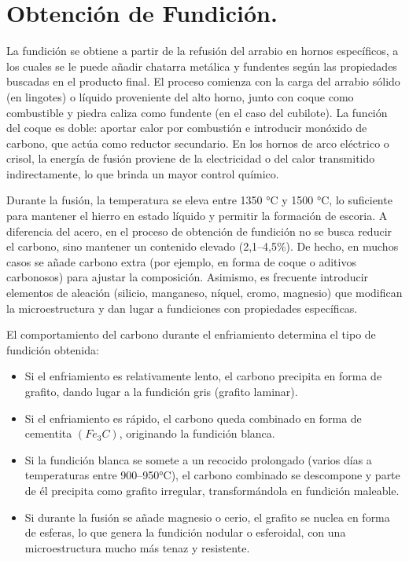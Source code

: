 \documentclass[12pt,a4paper]{article}
\begin{document}
\section{Obtención de Fundición.}
La fundición se obtiene a partir de la refusión del arrabio en hornos específicos, a los cuales se le puede añadir chatarra metálica y fundentes según las propiedades buscadas en el producto final. El proceso comienza con la carga del arrabio sólido (en lingotes) o líquido proveniente del alto horno, junto con coque como combustible y piedra caliza como fundente (en el caso del cubilote). La función del coque es doble: aportar calor por combustión e introducir monóxido de carbono, que actúa como reductor secundario. En los hornos de arco eléctrico o crisol, la energía de fusión proviene de la electricidad o del calor transmitido indirectamente, lo que brinda un mayor control químico.

Durante la fusión, la temperatura se eleva entre 1350 °C y 1500 °C, lo suficiente para mantener el hierro en estado líquido y permitir la formación de escoria. A diferencia del acero, en el proceso de obtención de fundición no se busca reducir el carbono, sino mantener un contenido elevado (2,1–4,5\%). De hecho, en muchos casos se añade carbono extra (por ejemplo, en forma de coque o aditivos carbonosos) para ajustar la composición. Asimismo, es frecuente introducir elementos de aleación (silicio, manganeso, níquel, cromo, magnesio) que modifican la microestructura y dan lugar a fundiciones con propiedades específicas.

El comportamiento del carbono durante el enfriamiento determina el tipo de fundición obtenida:

\begin{itemize}
    \item Si el enfriamiento es relativamente lento, el carbono precipita en forma de grafito, dando lugar a la fundición gris (grafito laminar).
    \item Si el enfriamiento es rápido, el carbono queda combinado en forma de cementita $(Fe_3C)$, originando la fundición blanca.
    \item Si la fundición blanca se somete a un recocido prolongado (varios días a temperaturas entre 900–950°C), el carbono combinado se descompone y parte de él precipita como grafito irregular, transformándola en fundición maleable.
    \item Si durante la fusión se añade magnesio o cerio, el grafito se nuclea en forma de esferas, lo que genera la fundición nodular o esferoidal, con una microestructura mucho más tenaz y resistente.
\end{itemize}
\end{document}
